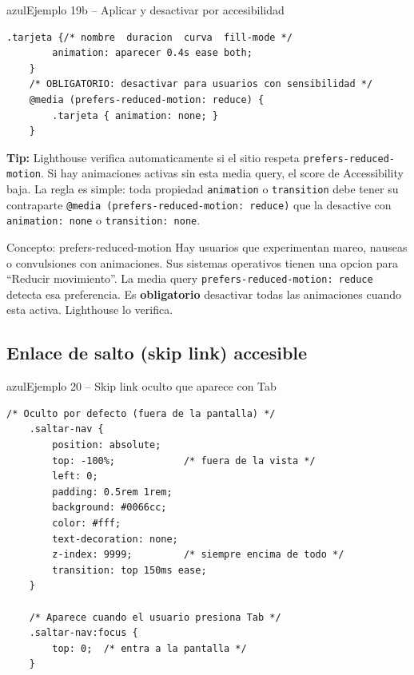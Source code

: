 \documentclass[11pt,a4paper]{article}
\begin{document}
	\begin{cajacodigo}{azul}{Ejemplo 19b -- Aplicar y desactivar por accesibilidad}
		\begin{lstlisting}[style=codecss]
	.tarjeta {/* nombre  duracion  curva  fill-mode */
		animation: aparecer 0.4s ease both;
	}
	/* OBLIGATORIO: desactivar para usuarios con sensibilidad */
	@media (prefers-reduced-motion: reduce) {
		.tarjeta { animation: none; }
	} \end{lstlisting}
	\end{cajacodigo}
	
	\textbf{Tip:} Lighthouse verifica automaticamente si el sitio respeta \texttt{prefers-reduced-motion}. Si hay animaciones activas sin esta media query, el score de Accessibility baja. La regla es simple: toda propiedad \texttt{animation} o \texttt{transition} debe tener su contraparte \texttt{@media (prefers-reduced-motion: reduce)} que la desactive con \texttt{animation: none} o \texttt{transition: none}.
	
	\begin{cajaconcepto}{Concepto: prefers-reduced-motion}
		Hay usuarios que experimentan mareo, nauseas o convulsiones con animaciones. Sus sistemas operativos tienen una opcion para ``Reducir movimiento''. La media query \texttt{prefers-reduced-motion: reduce} detecta esa preferencia. Es \textbf{obligatorio} desactivar todas las animaciones cuando esta activa. Lighthouse lo verifica.
	\end{cajaconcepto}
	
	\subsection{Enlace de salto (skip link) accesible}
	
	\begin{cajacodigo}{azul}{Ejemplo 20 -- Skip link oculto que aparece con Tab}
		\begin{lstlisting}[style=codecss]
	/* Oculto por defecto (fuera de la pantalla) */
	.saltar-nav {
		position: absolute;
		top: -100%;            /* fuera de la vista */
		left: 0;
		padding: 0.5rem 1rem;
		background: #0066cc;
		color: #fff;
		text-decoration: none;
		z-index: 9999;         /* siempre encima de todo */
		transition: top 150ms ease;
	}
	
	/* Aparece cuando el usuario presiona Tab */
	.saltar-nav:focus {
		top: 0;  /* entra a la pantalla */
	} \end{lstlisting}
	\end{cajacodigo}
	
\end{document}
